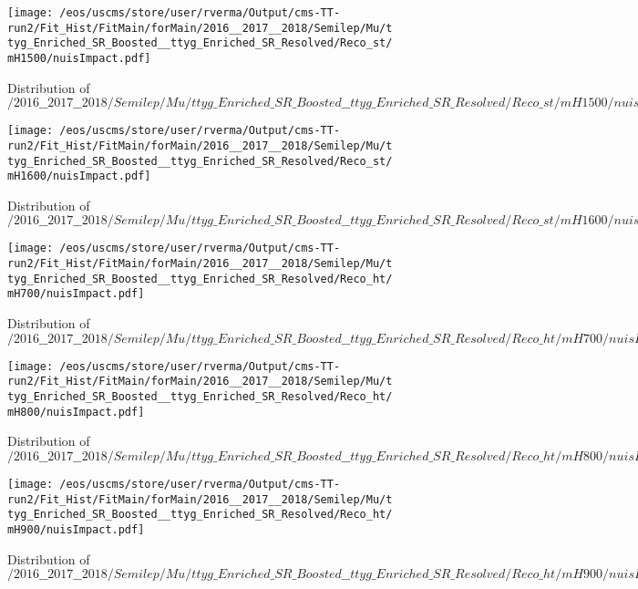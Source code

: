 \begin{figure}
\centering
\texttt{[image: /eos/uscms/store/user/rverma/Output/cms-TT-run2/Fit\_Hist/FitMain/forMain/2016\_\_2017\_\_2018/Semilep/Mu/ttyg\_Enriched\_SR\_Boosted\_\_ttyg\_Enriched\_SR\_Resolved/Reco\_st/mH1500/nuisImpact.pdf]}
\caption{Distribution of $/2016\_\_2017\_\_2018/Semilep/Mu/ttyg\_Enriched\_SR\_Boosted\_\_ttyg\_Enriched\_SR\_Resolved/Reco\_st/mH1500/nuisImpact.pdf$}
\end{figure}

\begin{figure}
\centering
\texttt{[image: /eos/uscms/store/user/rverma/Output/cms-TT-run2/Fit\_Hist/FitMain/forMain/2016\_\_2017\_\_2018/Semilep/Mu/ttyg\_Enriched\_SR\_Boosted\_\_ttyg\_Enriched\_SR\_Resolved/Reco\_st/mH1600/nuisImpact.pdf]}
\caption{Distribution of $/2016\_\_2017\_\_2018/Semilep/Mu/ttyg\_Enriched\_SR\_Boosted\_\_ttyg\_Enriched\_SR\_Resolved/Reco\_st/mH1600/nuisImpact.pdf$}
\end{figure}

\begin{figure}
\centering
\texttt{[image: /eos/uscms/store/user/rverma/Output/cms-TT-run2/Fit\_Hist/FitMain/forMain/2016\_\_2017\_\_2018/Semilep/Mu/ttyg\_Enriched\_SR\_Boosted\_\_ttyg\_Enriched\_SR\_Resolved/Reco\_ht/mH700/nuisImpact.pdf]}
\caption{Distribution of $/2016\_\_2017\_\_2018/Semilep/Mu/ttyg\_Enriched\_SR\_Boosted\_\_ttyg\_Enriched\_SR\_Resolved/Reco\_ht/mH700/nuisImpact.pdf$}
\end{figure}

\begin{figure}
\centering
\texttt{[image: /eos/uscms/store/user/rverma/Output/cms-TT-run2/Fit\_Hist/FitMain/forMain/2016\_\_2017\_\_2018/Semilep/Mu/ttyg\_Enriched\_SR\_Boosted\_\_ttyg\_Enriched\_SR\_Resolved/Reco\_ht/mH800/nuisImpact.pdf]}
\caption{Distribution of $/2016\_\_2017\_\_2018/Semilep/Mu/ttyg\_Enriched\_SR\_Boosted\_\_ttyg\_Enriched\_SR\_Resolved/Reco\_ht/mH800/nuisImpact.pdf$}
\end{figure}

\begin{figure}
\centering
\texttt{[image: /eos/uscms/store/user/rverma/Output/cms-TT-run2/Fit\_Hist/FitMain/forMain/2016\_\_2017\_\_2018/Semilep/Mu/ttyg\_Enriched\_SR\_Boosted\_\_ttyg\_Enriched\_SR\_Resolved/Reco\_ht/mH900/nuisImpact.pdf]}
\caption{Distribution of $/2016\_\_2017\_\_2018/Semilep/Mu/ttyg\_Enriched\_SR\_Boosted\_\_ttyg\_Enriched\_SR\_Resolved/Reco\_ht/mH900/nuisImpact.pdf$}
\end{figure}

